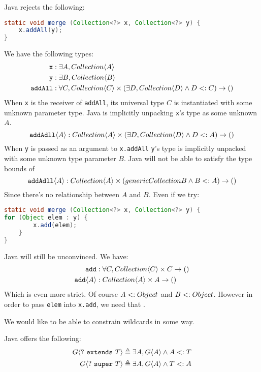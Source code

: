 \documentclass{article}
\begin{document}
\begin{example}
Java rejects the following:
\begin{lstlisting}[escapechar=|, language=Java]
static void merge (Collection<?> x, Collection<?> y) {
    x.addAll(y);
}
\end{lstlisting}
We have the following types:
\begin{align*}
    \texttt{x} &: \exists A, Collection \langle A \rangle \\
    \texttt{y} &: \exists B, Collection \langle B \rangle \\
    \texttt{addAll} &: \forall C, Collection \langle C \rangle \times (\exists D, Collection \langle D \rangle \wedge D <: C) \rightarrow ()
\end{align*}
When \texttt{x} is the receiver of \texttt{addAll}, its universal type $C$ is instantiated with some unknown parameter type.
Java is implicitly unpacking \texttt{x}'s type as some unknown $A$.
$$ \texttt{addAdll} \langle A \rangle : Collection \langle A \rangle \times (\exists D, Collection \langle D \rangle \wedge D <: A) \rightarrow ()$$
When \texttt{y} is passed as an argument to \texttt{x.addAll} \texttt{y}'s type is implicitly unpacked with some unknown type parameter $B$.
Java will not be able to satisfy the type bounds of
$$ \texttt{addAdll} \langle A \rangle : Collection \langle A \rangle \times (generic{Collection}{B} \wedge B <: A) \rightarrow ()$$
Since there's no relationship between $A$ and $B$.
Even if we try:
\begin{lstlisting}[escapechar=|, language=Java]
static void merge (Collection<?> x, Collection<?> y) {
for (Object elem : y) {
        x.add(elem);
    }
}
\end{lstlisting}
Java will still be unconvinced.
We have:
\begin{align*}
\texttt{add} &: \forall C, Collection \langle C \rangle \times C \rightarrow () \\
\texttt{add} \langle A \rangle &: Collection \langle A \rangle \times A \rightarrow ()
\end{align*}
Which is even more strict.
Of course $A <: Object$ and $B <: Object$.
However in order to pass \texttt{elem} into \texttt{x.add}, we need that \texttt{}.
\end{example}

We would like to be able to constrain wildcards in some way.

\begin{definition}
Java offers the following:
\begin{align*}
G \langle ? ~ \texttt{extends} ~ T \rangle &\triangleq \exists A, G \langle A \rangle \wedge A <: T \\
G \langle ? ~ \texttt{super} ~ T \rangle &\triangleq \exists A, G \langle A \rangle \wedge T <: A
\end{align*}
\end{definition}
\end{document}
